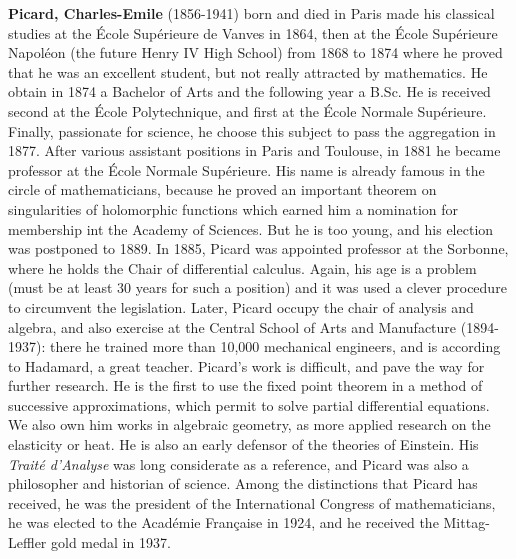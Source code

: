 \textbf{Picard, Charles-Emile} (1856-1941) born and died in Paris made his classical studies at the  École Supérieure de Vanves in 1864, then at the École Supérieure Napoléon (the future Henry IV High School) from 1868 to 1874 where he proved that he was an excellent student, but not really attracted by mathematics. He obtain in 1874 a Bachelor of Arts and the following year a B.Sc. He is received second at the École Polytechnique, and first at the École Normale Supérieure. Finally, passionate for science, he choose this subject to pass the aggregation in 1877. After various assistant positions in Paris and Toulouse, in 1881 he became professor at the École Normale Supérieure. His name is already famous in the circle of mathematicians, because he proved an important theorem on singularities of holomorphic functions which earned him a nomination for membership int the Academy of Sciences. But he is too young, and his election was postponed to 1889. In 1885, Picard was appointed professor at the Sorbonne, where he holds the Chair of differential calculus. Again, his age is a problem (must be at least 30 years for such a position) and it was used a clever procedure to circumvent the legislation. Later, Picard occupy the chair of analysis and algebra, and also exercise at the Central School of Arts and Manufacture (1894-1937): there he trained more than 10,000 mechanical engineers, and is according to Hadamard, a great teacher. Picard's work is difficult, and pave the way for further research. He is the first to use the fixed point theorem in a method of successive approximations, which permit to solve partial differential equations. We also own him works in algebraic geometry, as more applied research on the elasticity or heat. He is also an early defensor of the theories of Einstein. His \textit{Traité d'Analyse} was long considerate as a reference, and Picard was also a philosopher and historian of science. Among the distinctions that Picard has received, he was the president of the International Congress of mathematicians, he was elected to the Académie Française in 1924, and he received the Mittag-Leffler gold medal in 1937.

